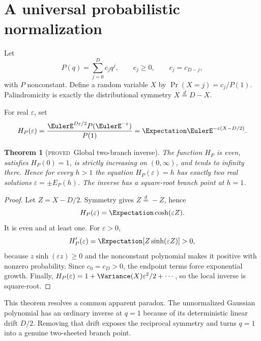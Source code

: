 \documentclass[11pt,letterpaper,oneside,openany]{book}
\newtheorem{theorem}{Theorem}[chapter]
\theoremstyle{definition}
\theoremstyle{remark}
\newcommand{\statusproved}{\textcolor{provedgreen}{\textsc{proved}}}
\begin{document}
\section{A universal probabilistic normalization}
Let
\[
 P(q)=\sum_{j=0}^D c_jq^j,
 \qquad c_j\ge0,
 \qquad c_j=c_{D-j},
\]
with \(P\) nonconstant.  Define a random variable \(X\) by
\(\Pr(X=j)=c_j/P(1)\).  Palindromicity is exactly the distributional symmetry
\(X\overset d=D-X\).

For real \(\varepsilon\), set
\begin{equation}
 H_P(\varepsilon)=
 \frac{\EulerE^{D\varepsilon/2}P(\EulerE^{-\varepsilon})}{P(1)}
 =\Expectation\EulerE^{-\varepsilon(X-D/2)}.
 \label{eq:centered-palindromic}
\end{equation}

\begin{theorem}[\statusproved\ Global two-branch inverse]
The function \(H_P\) is even, satisfies \(H_P(0)=1\), is strictly increasing on
\((0,\infty)\), and tends to infinity there.  Hence for every \(h>1\) the
equation \(H_P(\varepsilon)=h\) has exactly two real solutions
\(\varepsilon=\pm E_P(h)\).  The inverse has a square-root branch point at
\(h=1\).
\end{theorem}
\begin{proof}
Let \(Z=X-D/2\).  Symmetry gives \(Z\overset d=-Z\), hence
\[
 H_P(\varepsilon)=\Expectation\cosh(\varepsilon Z).
\]
It is even and at least one.  For \(\varepsilon>0\),
\[
 H_P'(\varepsilon)=\Expectation[Z\sinh(\varepsilon Z)]>0,
\]
because \(z\sinh(\varepsilon z)\ge0\) and the nonconstant polynomial makes it
positive with nonzero probability.  Since \(c_0=c_D>0\), the endpoint terms
force exponential growth.  Finally,
\(H_P(\varepsilon)=1+\Variance(X)\varepsilon^2/2+\cdots\), so the local inverse is
square-root.
\end{proof}

This theorem resolves a common apparent paradox.  The unnormalized Gaussian
polynomial has an ordinary inverse at \(q=1\) because of its deterministic
linear drift \(D/2\).  Removing that drift exposes the reciprocal symmetry and
turns \(q=1\) into a genuine two-sheeted branch point.
\end{document}
